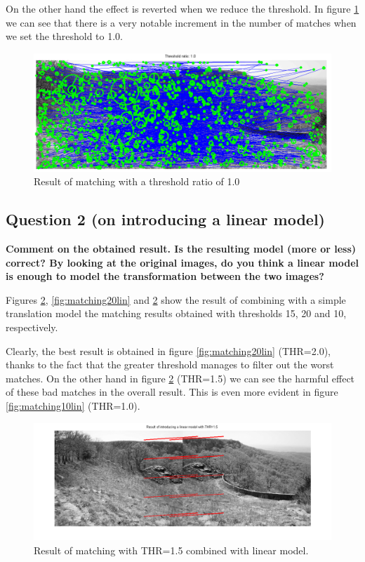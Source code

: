 On the other hand the effect is reverted when we reduce the threshold. In figure
\ref{fig:matching10thres} we can see that there is a very notable increment in
the number of matches when we set the threshold to 1.0.

\begin{figure}[htb]
	\centering
		\includegraphics[width=\textwidth]{./img/ex1/matching_10_thres.png}
	\caption{Result of matching with a threshold ratio of 1.0}
	\label{fig:matching10thres}
\end{figure}

\subsection{Question 2 (on introducing a linear model)}

{\bfseries Comment on the obtained result. Is the resulting model (more
or less) correct? By looking at the original images, do you think a linear model
is enough to model the transformation between the two images?\\[.5cm]}

Figures \ref{fig:matching15lin}, \ref{fig:matching20lin} and \ref{fig:matching15lin}
show the result of combining with a simple translation model the matching results
obtained with thresholds 15, 20 and 10, respectively.

Clearly, the best result is obtained in figure \ref{fig:matching20lin} (THR=2.0),
thanks to the fact that the greater threshold manages to filter out the worst matches.
On the other hand in figure \ref{fig:matching15lin} (THR=1.5) we can see the harmful
effect of these bad matches in the overall result.
This is even more evident in figure \ref{fig:matching10lin} (THR=1.0).

\begin{figure}[htb]
	\centering
		\includegraphics[width=\textwidth]{./img/ex1/matching_linear_model_15.png}
	\caption{Result of matching with THR=1.5 combined with linear model.}
	\label{fig:matching15lin}
\end{figure}

